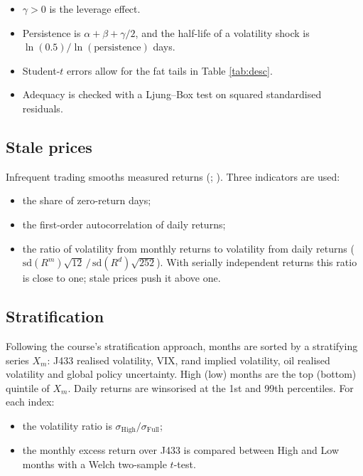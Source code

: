 \documentclass[11pt,preprint]{elsarticle}
\numberwithin{equation}{section}
\numberwithin{figure}{section}
\numberwithin{table}{section}
\def\tightlist{} %
\begin{document}
\begin{itemize}
\tightlist
\item
  \(\gamma > 0\) is the leverage effect.
\item
  Persistence is \(\alpha + \beta + \gamma/2\), and the half-life of a
  volatility shock is \(\ln(0.5)/\ln(\text{persistence})\) days.
\item
  Student-\(t\) errors allow for the fat tails in Table \ref{tab:desc}.
\item
  Adequacy is checked with a Ljung--Box test on squared standardised
  residuals.
\end{itemize}

\subsection{Stale prices}\label{stale-prices}

Infrequent trading smooths measured returns
(;
). Three indicators are used:

\begin{itemize}
\tightlist
\item
  the share of zero-return days;
\item
  the first-order autocorrelation of daily returns;
\item
  the ratio of volatility from monthly returns to volatility from daily
  returns
  (\(\text{sd}(R^{m})\sqrt{12} \,/\, \text{sd}(R^{d})\sqrt{252}\)). With
  serially independent returns this ratio is close to one; stale prices
  push it above one.
\end{itemize}

\subsection{Stratification}\label{stratification}

Following the course's stratification approach, months are sorted by a
stratifying series \(X_m\): J433 realised volatility, VIX, rand implied
volatility, oil realised volatility and global policy uncertainty. High
(low) months are the top (bottom) quintile of \(X_m\). Daily returns are
winsorised at the 1st and 99th percentiles. For each index:

\begin{itemize}
\tightlist
\item
  the volatility ratio is \(\sigma_{\text{High}}/\sigma_{\text{Full}}\);
\item
  the monthly excess return over J433 is compared between High and Low
  months with a Welch two-sample \(t\)-test.
\end{itemize}
\end{document}
